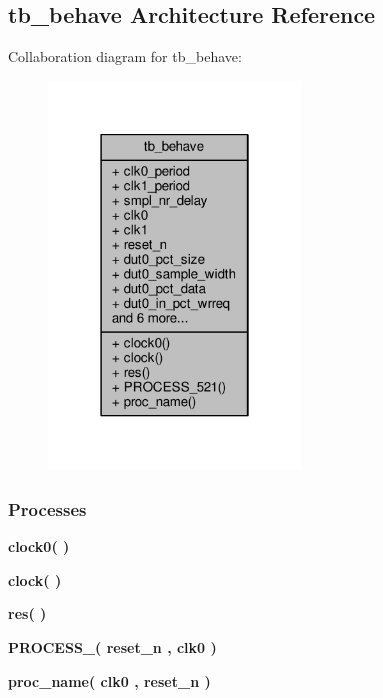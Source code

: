 \subsection{tb\+\_\+behave Architecture Reference}
\label{classpackets2data__top__tb_1_1tb__behave}


Collaboration diagram for tb\+\_\+behave\+:\nopagebreak
\begin{figure}[H]
\begin{center}
\leavevmode
\includegraphics[width=190pt]{da/dba/classpackets2data__top__tb_1_1tb__behave__coll__graph}
\end{center}
\end{figure}
\subsubsection*{Processes}
 \begin{DoxyCompactItemize}
\item 
{\bf clock0}{\bfseries  (  )}
\item 
{\bf clock}{\bfseries  (  )}
\item 
{\bf res}{\bfseries  (  )}
\item 
{\bf P\+R\+O\+C\+E\+S\+S\+\_}{\bfseries  ( {\bfseries {\bfseries {\bf reset\+\_\+n}} \textcolor{vhdlchar}{ }} , {\bfseries {\bfseries {\bf clk0}} \textcolor{vhdlchar}{ }} )}
\item 
{\bf proc\+\_\+name}{\bfseries  ( {\bfseries {\bfseries {\bf clk0}} \textcolor{vhdlchar}{ }} , {\bfseries {\bfseries {\bf reset\+\_\+n}} \textcolor{vhdlchar}{ }} )}
\end{DoxyCompactItemize}
